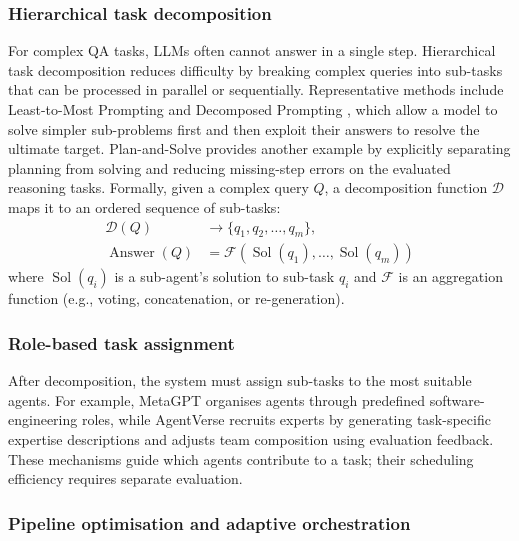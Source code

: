 \documentclass[a4paper,fleqn]{cas-dc}
\begin{document}
\subsubsection{Hierarchical task decomposition}
\label{sec:hier_decomp}

For complex QA tasks, LLMs often cannot answer in a single step.
Hierarchical task decomposition reduces difficulty by breaking complex queries
into sub-tasks that can be processed in parallel or sequentially.
Representative methods include Least-to-Most Prompting
\citep{zhou2023least_to_most} and Decomposed Prompting
\citep{khot2023decomposed_prompting}, which allow a model to solve simpler
sub-problems first and then exploit their answers to resolve the ultimate
target. Plan-and-Solve \citep{wang2023plan_and_solve} provides another example
by explicitly separating planning from solving and reducing missing-step
errors on the evaluated reasoning tasks.
Formally, given a complex query $Q$, a decomposition function $\mathcal{D}$
maps it to an ordered sequence of sub-tasks:
\begin{equation}
  \begin{aligned}
    \mathcal{D}(Q) &\to \{q_1, q_2, \ldots, q_m\}, \\
    \operatorname{Answer}(Q) &=
    \mathcal{F}\!\left(\operatorname{Sol}(q_1),\ldots,\operatorname{Sol}(q_m)\right)
  \end{aligned}
  \label{eq:decompose}
\end{equation}
where $\operatorname{Sol}(q_i)$ is a sub-agent's solution to sub-task $q_i$
and $\mathcal{F}$ is an aggregation function (e.g., voting, concatenation, or
re-generation).

\subsubsection{Role-based task assignment}
\label{sec:role_assign}

After decomposition, the system must assign sub-tasks to the most suitable
agents.
For example, MetaGPT \citep{hong2024metagpt} organises agents through
predefined software-engineering roles, while AgentVerse
\citep{chen2024agentverse} recruits experts by generating task-specific
expertise descriptions and adjusts team composition using evaluation
feedback. These mechanisms guide which agents contribute to a task;
their scheduling efficiency requires separate evaluation.

\subsubsection{Pipeline optimisation and adaptive orchestration}
\label{sec:load_balance}
\end{document}
